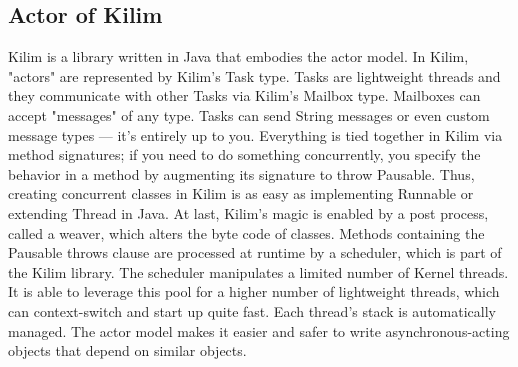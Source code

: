 \documentclass[twocolumn,a4paper,10pt]{article}
\begin{document}
\subsection{Actor of Kilim}
Kilim is a library written in Java that embodies the actor model. In Kilim, "actors" are represented by Kilim's Task type. Tasks are lightweight threads and they communicate with other Tasks via Kilim's Mailbox type. Mailboxes can accept "messages" of any type. Tasks can send String messages or even custom message types — it's entirely up to you. Everything is tied together in Kilim via method signatures; if you need to do something concurrently, you specify the behavior in a method by augmenting its signature to throw Pausable. Thus, creating concurrent classes in Kilim is as easy as implementing Runnable or extending Thread in Java. At last, Kilim's magic is enabled by a post process, called a weaver, which alters the byte code of classes. Methods containing the Pausable throws clause are processed at runtime by a scheduler, which is part of the Kilim library. The scheduler manipulates a limited number of Kernel threads. It is able to leverage this pool for a higher number of lightweight threads, which can context-switch and start up quite fast. Each thread's stack is automatically managed. The actor model makes it easier and safer to write asynchronous-acting objects that depend on similar objects.
\end{document}
